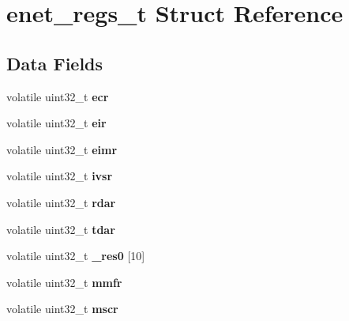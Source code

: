 \hypertarget{structenet__regs__t}{}\section{enet\+\_\+regs\+\_\+t Struct Reference}
\label{structenet__regs__t}
\subsection*{Data Fields}
\begin{DoxyCompactItemize}
\item 
\mbox{\label{structenet__regs__t_a72186cb34df106e836cc523d8af95f08}} 
volatile uint32\+\_\+t {\bfseries ecr}
\item 
\mbox{\label{structenet__regs__t_a4894123ae00171548af3d8c4f29341a5}} 
volatile uint32\+\_\+t {\bfseries eir}
\item 
\mbox{\label{structenet__regs__t_a1a5a1b67420d5f677c3f10d7cb797139}} 
volatile uint32\+\_\+t {\bfseries eimr}
\item 
\mbox{\label{structenet__regs__t_a5529a77f6c00610080a78c113375d813}} 
volatile uint32\+\_\+t {\bfseries ivsr}
\item 
\mbox{\label{structenet__regs__t_aa4939154d3c8de140fd993724678c6a8}} 
volatile uint32\+\_\+t {\bfseries rdar}
\item 
\mbox{\label{structenet__regs__t_ae1f0f63ff7c4f97a5dccfc6ed824858c}} 
volatile uint32\+\_\+t {\bfseries tdar}
\item 
\mbox{\label{structenet__regs__t_a93308cdfc9aba67bee5b5f4760efbdbe}} 
volatile uint32\+\_\+t {\bfseries \+\_\+res0} \mbox{[}10\mbox{]}
\item 
\mbox{\label{structenet__regs__t_a13d3d86f41723a11f3022393517746b3}} 
volatile uint32\+\_\+t {\bfseries mmfr}
\item 
\mbox{\label{structenet__regs__t_abedfbfb5013622a44e91d6b959e6c18c}} 
volatile uint32\+\_\+t {\bfseries mscr}

\end{DoxyCompactItemize}
